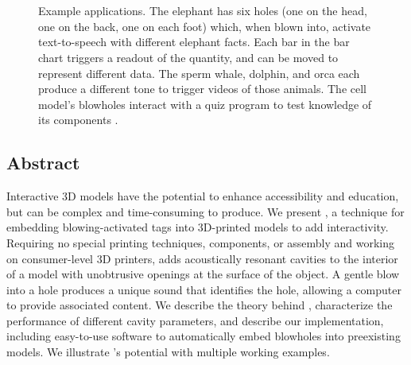 \chapter{\bh}

	\begin{figure}[h]
		\centering
		 \hfill

    \label{fig:blowhole_demo}%
    \caption{Example \bh applications. The elephant
      \protect{} has six holes (one on the head, one on the
      back, one on each foot) which, when blown into, activate text-to-speech with
      different elephant facts. Each bar in the bar chart
      \protect{} triggers a readout of the quantity, and can be
      moved to represent different data. The sperm whale, dolphin, and orca
      \protect{} each produce a different tone to trigger videos
      of those animals. The cell model's blowholes interact with a quiz program to
      test knowledge of its components \protect{}.}
	\end{figure}

  \section{Abstract}
    Interactive 3D models have the potential to enhance accessibility and
    education, but can be complex and time-consuming to produce. We present
    \textit{\bh}, a technique for embedding blowing-activated tags into
    3D-printed models to add interactivity. Requiring no special printing
    techniques, components, or assembly and working on consumer-level 3D
    printers, \bh adds acoustically resonant cavities to the interior of a model
    with unobtrusive openings at the surface of the object. A gentle blow into a
    hole produces a unique sound that identifies the hole, allowing a computer
    to provide associated content. We describe the theory behind \bh,
    characterize the performance of different cavity parameters, and describe
    our implementation, including easy-to-use software to automatically embed
    blowholes into preexisting models. We illustrate \bh's potential with
    multiple working examples. 
  
